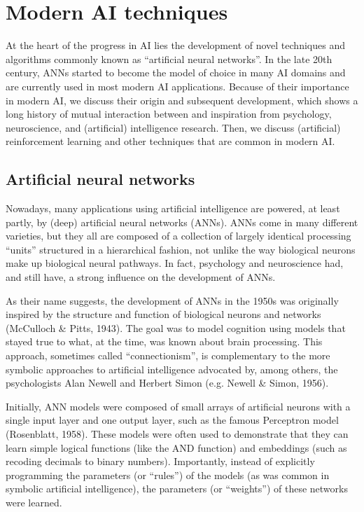 \section{Modern AI techniques}

At the heart of the progress in AI lies the development of novel
techniques and algorithms commonly known as ``artificial neural
networks''.
In the late 20th century, ANNs started to become the model of choice
in many AI domains and are currently used in most modern AI applications.
Because of their importance in modern AI, we discuss their origin and
subsequent development, which shows a long history of mutual interaction
between and inspiration from psychology, neuroscience, and (artificial)
intelligence research.
Then, we discuss (artificial) reinforcement learning and other techniques
that are common in modern AI.

\subsection{Artificial neural networks}

Nowadays, many applications using artificial intelligence are powered,
at least partly, by (deep) artificial neural networks (ANNs).
ANNs come in many different varieties, but they all are composed of a
collection of largely identical processing ``units'' structured in a
hierarchical fashion, not unlike the way biological neurons make up
biological neural pathways.
In fact, psychology and neuroscience had, and still have, a strong
influence on the development of ANNs.

As their name suggests, the development of ANNs in the 1950s was
originally inspired by the structure and function of biological neurons
and networks (McCulloch \& Pitts, 1943).
The goal was to model cognition using models that stayed true to what,
at the time, was known about brain processing.
This approach, sometimes called ``connectionism'', is complementary
to the more symbolic approaches to artificial intelligence advocated
by, among others, the psychologists Alan Newell and Herbert Simon
(e.g. Newell \& Simon, 1956).

Initially, ANN models were composed of small arrays of artificial
neurons with a single input layer and one output layer, such as the
famous Perceptron model (Rosenblatt, 1958).
These models were often used to demonstrate that they can learn simple
logical functions (like the AND function) and embeddings (such as
recoding decimals to binary numbers).
Importantly, instead of explicitly programming the parameters
(or ``rules'') of the models (as was common in symbolic artificial
intelligence), the parameters (or ``weights'') of these networks
were learned.

